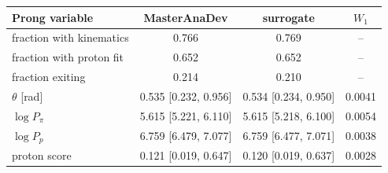 \begin{tabular}{lccc}
\toprule
Prong variable & MasterAnaDev & surrogate & $W_1$ \\
\midrule
fraction with kinematics & 0.766 & 0.769 & -- \\
fraction with proton fit & 0.652 & 0.652 & -- \\
fraction exiting & 0.214 & 0.210 & -- \\
$\theta$ [rad] & 0.535 [0.232, 0.956] & 0.534 [0.234, 0.950] & 0.0041 \\
$\log P_\pi$ & 5.615 [5.221, 6.110] & 5.615 [5.218, 6.100] & 0.0054 \\
$\log P_p$ & 6.759 [6.479, 7.077] & 6.759 [6.477, 7.071] & 0.0038 \\
proton score & 0.121 [0.019, 0.647] & 0.120 [0.019, 0.637] & 0.0028 \\
\bottomrule
\end{tabular}
